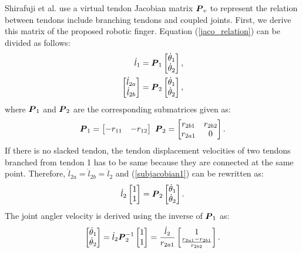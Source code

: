 \documentclass{llncs}
\def\vect#1{\mbox{\boldmath$#1$}}
\begin{document}
Shirafuji et al.\cite{Shirafuji2014b} use a virtual tendon Jacobian matrix $\vect{P}_v$ to represent the relation between tendons include branching tendons and coupled joints.
First, we derive this matrix of the proposed robotic finger.
Equation (\ref{jaco_relation}) can be divided as follows:
\begin{align}
	\dot{l}_{1}&=\vect{P}_{1}
							\begin{bmatrix}
								\dot{\theta}_{1}\\
								\dot{\theta}_{2}
							\end{bmatrix},		\label{subjacobian2}\\
	\begin{bmatrix}
		\dot{l}_{2a}\\
		\dot{l}_{2b}
	\end{bmatrix}&=\vect{P}_{2}
							\begin{bmatrix}
						\dot{\theta}_{1}\\
						\dot{\theta}_{2}
							\end{bmatrix},		\label{subjacobian1}
\end{align}
where $\vect{P}_{1}$ and $\vect{P}_{2}$ are the corresponding submatrices given as:
\begin{align}
	\vect{P}_{1}=
			\begin{bmatrix}
				-r_{11}&-r_{12}
			\end{bmatrix}
				\ 
	\vect{P}_{2}=
			\begin{bmatrix}
				r_{2b1}&r_{2b2}\\
				r_{2a1}&0
			\end{bmatrix}.			\label{subjacobian_value}
\end{align}
If there is no slacked tendon, the tendon displacement velocities of two tendons branched from tendon 1 has to be same because they are connected at the same point.
Therefore, $\dot{l}_{2a}=\dot{l}_{2b}=\dot{l}_{2}$ and (\ref{subjacobian1}) can be rewritten as:
\begin{align}
	\dot{l}_{2}
	\begin{bmatrix}
		1\\
		1
	\end{bmatrix}
							=\vect{P}_{2}
							\begin{bmatrix}
						\dot{\theta}_{1}\\
						\dot{\theta}_{2}
							\end{bmatrix}.
\end{align}
The joint angler velocity is derived using the inverse of $\vect{P}_{1}$ as:
\begin{align}
		\begin{bmatrix}
	\dot{\theta}_{1}\\
	\dot{\theta}_{2}
		\end{bmatrix}
	=\dot{l}_{2}\vect{P}_{2}^{-1}
	\begin{bmatrix}
		1\\
		1
	\end{bmatrix}
									=\frac{\dot{l}_{2}}{r_{2a1}}
									\begin{bmatrix}
									1\\
									\frac{r_{2a1}-r_{2b1}}{r_{2b2}}
									\end{bmatrix}.
\label{theta}
\end{align}
\end{document}
